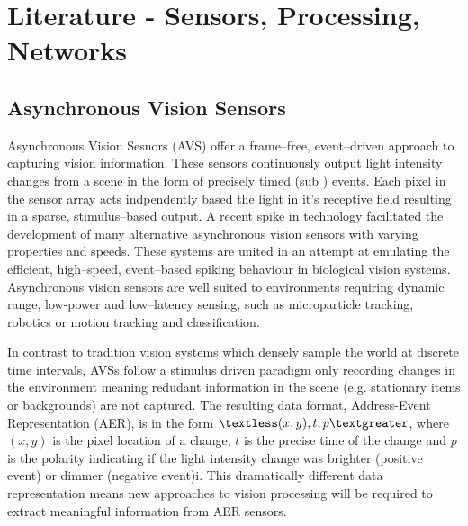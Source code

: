 \chapter{Literature - Sensors, Processing, Networks}


\section{Asynchronous Vision Sensors}  %
Asynchronous Vision Sesnors (AVS) offer a frame--free, event--driven approach to capturing vision information\cite{delbruck2010activity}. 
These sensors continuously output light intensity changes from a scene in the form of precisely timed (sub \ms) events. 
Each pixel in the sensor array acts indpendently based the light in it's receptive field resulting in a sparse, stimulus--based output. 
A recent spike in technology facilitated the development of many alternative asynchronous vision sensors with varying properties and speeds\cite{delbruck2014research}.
These systems are united in an attempt at emulating the efficient, high--speed, event--based spiking behaviour in biological vision systems\cite{delbruck2010activity}.
Asynchronous vision sensors are well suited to environments requiring dynamic range, low-power and low--latency sensing, such as microparticle tracking\cite{ni2012asynchronous}, robotics\cite{roboGoalie2013} or motion tracking and classification\cite{Lee2014, reverter2015neuromorphic}.

In contrast to tradition vision systems which densely sample the world at discrete time intervals, AVSs follow a stimulus driven paradigm only recording changes in the environment meaning redudant information in the scene (e.g. stationary items or backgrounds) are not captured.  
The resulting data format, Address-Event Representation (AER)\cite{boahen2000point}, is in the form $\textless (x, y), t, p \textgreater$, where $(x, y)$ is the pixel location of a change, $t$ is the precise time of the change and $p$ is the polarity indicating if the light intensity change was brighter (positive event) or dimmer (negative event)i\cite{delbruck2010activity}. 
This dramatically different data representation means new approaches to vision processing will be required to extract meaningful information from AER sensors\cite{akolkar2015can}. 

